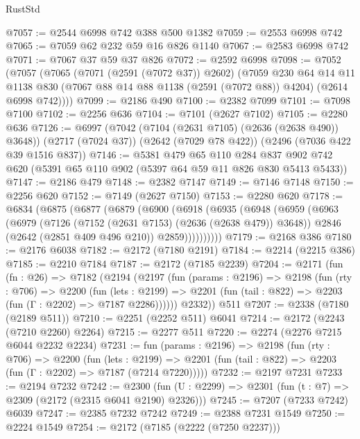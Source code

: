 \begin{lexlean}{RustStd}
\begin{coremodule}
@7057 := @2544 @6998 @742 @388 @500 @1382
@7059 := @2553 @6998 @742
@7065 := @7059 @62 @232 @59 @16 @826 @1140
@7067 := @2583 @6998 @742
@7071 := @7067 @37 @59 @37 @826
@7072 := @2592 @6998
@7098 := @7052
    (@7057
      (@7065
        (@7071 (@2591 (@7072 @37)) @2602)
        (@7059
          @230
          @64
          @14
          @11
          @1138
          @830
          (@7067 @88 @14 @88 @1138 (@2591 (@7072 @88)) @4204)
          (@2614 @6998 @742))))
@7099 := @2186 @490
@7100 := @2382 @7099
@7101 := @7098 @7100
@7102 := @2256 @636
@7104 := @7101 (@2627 @7102)
@7105 := @2280 @636
@7126 := @6997
    (@7042 (@7104 (@2631 @7105) (@2636 (@2638 @490)) @3648))
    (@2717 (@7024 @37))
    (@2642 (@7029 @78 @422))
    (@2496 (@7036 @422 @39 @1516 @837))
@7146 := @5381
    @479
    @65
    @110
    @284
    @837
    @902
    @742
    @620
    (@5391 @65 @110 @902 (@5397 @64 @59 @11 @826 @830 @5413 @5433))
@7147 := @2186 @479
@7148 := @2382 @7147
@7149 := @7146 @7148
@7150 := @2256 @620
@7152 := @7149 (@2627 @7150)
@7153 := @2280 @620
@7178 := @6834
    (@6875
      (@6877
        (@6879
          (@6900
            (@6918
              (@6935
                (@6948
                  (@6959
                    (@6963
                      (@6979
                        (@7126 (@7152 (@2631 @7153) (@2636 (@2638 @479)) @3648))
                        @2846
                        (@2642 (@2851 @409 @496 @210))
                        @2859))))))))))
@7179 := @2168 @386
@7180 := @2176 @6038
@7182 := @2172 (@7180 @2191)
@7184 := @2214 (@2215 @386)
@7185 := @2210 @7184
@7187 := @2172 (@7185 @2239)
@7204 := @2171
    (fun (fn : @26) =>
    @7182
      (@2194
        (@2197
          (fun (params : @2196) =>
          @2198
            (fun (rty : @706) =>
            @2200
              (fun (lets : @2199) =>
              @2201 (fun (tail : @822) => @2203 (fun (Γ : @2202) => @7187 @2286))))))
        @2332))
    @511
@7207 := @2338 (@7180 (@2189 @511))
@7210 := @2251 (@2252 @511) @6041
@7214 := @2172 (@2243 (@7210 @2260) @2264)
@7215 := @2277 @511
@7220 := @2274 (@2276 @7215 @6044 @2232 @2234)
@7231 := fun (params : @2196) =>
  @2198
    (fun (rty : @706) =>
    @2200
      (fun (lets : @2199) =>
      @2201 (fun (tail : @822) => @2203 (fun (Γ : @2202) => @7187 (@7214 @7220)))))
@7232 := @2197 @7231
@7233 := @2194 @7232
@7242 := @2300 (fun (U : @2299) => @2301 (fun (t : @7) => @2309 (@2172 (@2315 @6041 @2190) @2326)))
@7245 := @7207 (@7233 @7242) @6039
@7247 := @2385 @7232 @7242
@7249 := @2388 @7231 @1549
@7250 := @2224 @1549
@7254 := @2172 (@7185 (@2222 (@7250 @2237)))

\end{coremodule}
\end{lexlean}
